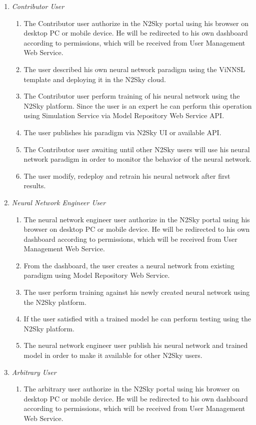 \begin{enumerate}
\item \emph{Contributor User}
\begin{enumerate}
\item The Contributor user authorize in the N2Sky portal using his browser on desktop PC or mobile device. He will be redirected to his own dashboard according to permissions, which will be received from User Management Web Service. 
\item The user described his own neural network paradigm using the ViNNSL template and deploying it in the N2Sky cloud. 
\item The Contributor user perform training of his neural network using the N2Sky platform. Since the user is an expert he can perform this operation using Simulation Service via Model Repository Web Service API.
\item The user publishes his paradigm via N2Sky UI or available API. 
\item The Contributor user awaiting until other N2Sky users will use his neural network paradigm in order to monitor the behavior of the neural network. 
\item The user modify, redeploy and retrain his neural network after first results. 
\end{enumerate}
\item \emph{Neural Network Engineer User}
\begin{enumerate}
\item The neural network engineer user authorize in the N2Sky portal using his browser on desktop PC or mobile device. He will be redirected to his own dashboard according to permissions, which will be received from User Management Web Service. 
\item From the dashboard, the user creates a neural network from existing paradigm using Model Repository Web Service.
\item The user perform training against his newly created neural network using the N2Sky platform. 
\item If the user satisfied with a trained model he can perform testing using the N2Sky platform. 
\item The neural network engineer user publish his neural network and trained model in order to make it available for other N2Sky users. 
\end{enumerate}
\item \emph{Arbitrary User}
\begin{enumerate}
\item The arbitrary user authorize in the N2Sky portal using his browser on desktop PC or mobile device. He will be redirected to his own dashboard according to permissions, which will be received from User Management Web Service. 

\end{enumerate}
\end{enumerate}
